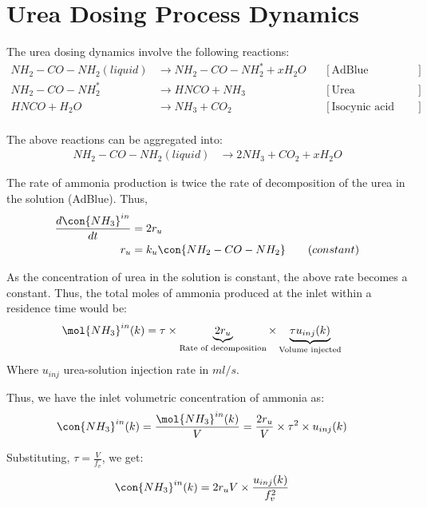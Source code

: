\newpage
\section{Urea Dosing Process Dynamics}
The urea dosing dynamics involve the following reactions:
\begin{align*}
    NH_2 - CO - NH_2 (liquid) &\longrightarrow NH_2 - CO - NH_2^* + x H_2 O
                & &[\text{AdBlue evaporation}] \\
    NH_2 - CO - NH_2^*  &\longrightarrow  HNCO + NH_3
                & &[\text{Urea decomposition}] \\
    HNCO + H_2O &\longrightarrow NH_3 + CO_2
                & &[\text{Isocynic acid hydrolysis}] \\
\end{align*}

The above reactions can be aggregated into:
\begin{align*}
    NH_2 - CO - NH_2 (liquid) &\longrightarrow 2 NH_3 + CO_2 + x H_2 O
\end{align*}

The rate of ammonia production is twice the rate of decomposition of the urea in the solution (AdBlue). Thus,
\begin{align*}
    \frac{d \con{NH_3}^{in}}{dt} &= 2 r_{u}\\
    r_{u} &= k_{u} \con{NH_2 - CO - NH_2} \qquad (constant)
\end{align*}

As the concentration of urea in the solution is constant, the above rate becomes a constant. Thus, the total moles of
ammonia produced at the inlet within a residence time would be:
\begin{align*}
    \mol{NH_3}^{in} (k) &= \tau \times \underbrace{2 r_{u}}_{\text{Rate of decomposition}} \times \underbrace{\tau u_{inj} (k)}_{\text{Volume injected}}
\end{align*}
Where $u_{inj}$ urea-solution injection rate in $ml/s$.

Thus, we have the inlet volumetric concentration of ammonia as:
\begin{align*}
    \con{NH_3}^{in} (k) &= \frac{\mol{NH_3}^{in} (k)}{V}
                          = \frac{2 r_u}{V} \times \tau^2 \times u_{inj} (k)
\end{align*}

Substituting, $\tau = \frac{V}{f_v}$, we get:
\begin{align}
    \con{NH_3}^{in} (k) &= 2r_u V \times \frac{u_{inj}(k)}{f_v^2}
\end{align}


